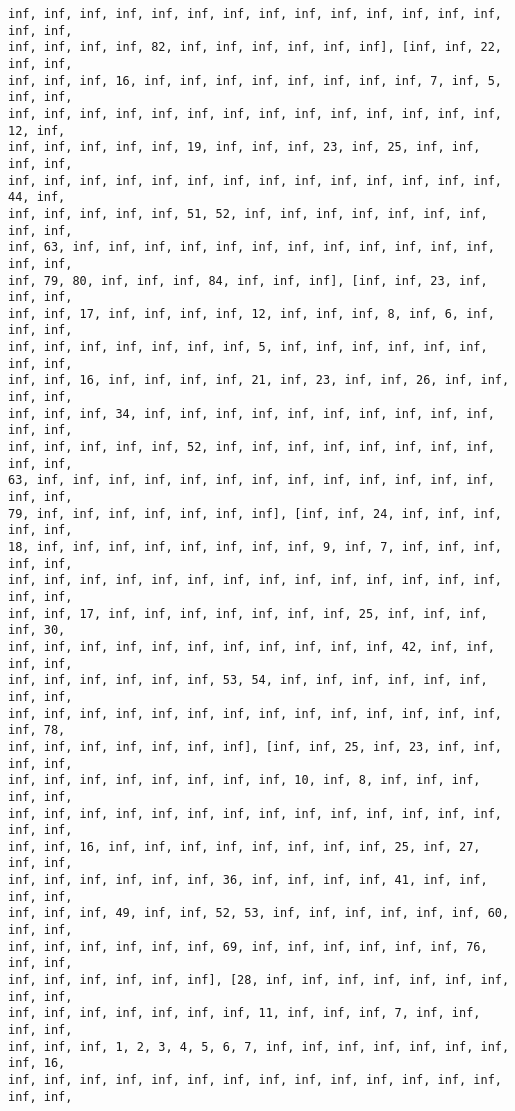 \documentclass[11pt]{article}
\begin{document}
\begin{Verbatim}[commandchars=\\\{\}]
inf, inf, inf, inf, inf, inf, inf, inf, inf, inf, inf, inf, inf, inf, inf, inf,
inf, inf, inf, inf, 82, inf, inf, inf, inf, inf, inf], [inf, inf, 22, inf, inf,
inf, inf, inf, 16, inf, inf, inf, inf, inf, inf, inf, inf, 7, inf, 5, inf, inf,
inf, inf, inf, inf, inf, inf, inf, inf, inf, inf, inf, inf, inf, inf, 12, inf,
inf, inf, inf, inf, inf, 19, inf, inf, inf, 23, inf, 25, inf, inf, inf, inf,
inf, inf, inf, inf, inf, inf, inf, inf, inf, inf, inf, inf, inf, inf, 44, inf,
inf, inf, inf, inf, inf, 51, 52, inf, inf, inf, inf, inf, inf, inf, inf, inf,
inf, 63, inf, inf, inf, inf, inf, inf, inf, inf, inf, inf, inf, inf, inf, inf,
inf, 79, 80, inf, inf, inf, 84, inf, inf, inf], [inf, inf, 23, inf, inf, inf,
inf, inf, 17, inf, inf, inf, inf, 12, inf, inf, inf, 8, inf, 6, inf, inf, inf,
inf, inf, inf, inf, inf, inf, inf, 5, inf, inf, inf, inf, inf, inf, inf, inf,
inf, inf, 16, inf, inf, inf, inf, 21, inf, 23, inf, inf, 26, inf, inf, inf, inf,
inf, inf, inf, 34, inf, inf, inf, inf, inf, inf, inf, inf, inf, inf, inf, inf,
inf, inf, inf, inf, inf, 52, inf, inf, inf, inf, inf, inf, inf, inf, inf, inf,
63, inf, inf, inf, inf, inf, inf, inf, inf, inf, inf, inf, inf, inf, inf, inf,
79, inf, inf, inf, inf, inf, inf, inf], [inf, inf, 24, inf, inf, inf, inf, inf,
18, inf, inf, inf, inf, inf, inf, inf, inf, 9, inf, 7, inf, inf, inf, inf, inf,
inf, inf, inf, inf, inf, inf, inf, inf, inf, inf, inf, inf, inf, inf, inf, inf,
inf, inf, 17, inf, inf, inf, inf, inf, inf, inf, 25, inf, inf, inf, inf, 30,
inf, inf, inf, inf, inf, inf, inf, inf, inf, inf, inf, 42, inf, inf, inf, inf,
inf, inf, inf, inf, inf, inf, 53, 54, inf, inf, inf, inf, inf, inf, inf, inf,
inf, inf, inf, inf, inf, inf, inf, inf, inf, inf, inf, inf, inf, inf, inf, 78,
inf, inf, inf, inf, inf, inf, inf], [inf, inf, 25, inf, 23, inf, inf, inf, inf,
inf, inf, inf, inf, inf, inf, inf, inf, 10, inf, 8, inf, inf, inf, inf, inf,
inf, inf, inf, inf, inf, inf, inf, inf, inf, inf, inf, inf, inf, inf, inf, inf,
inf, inf, 16, inf, inf, inf, inf, inf, inf, inf, inf, 25, inf, 27, inf, inf,
inf, inf, inf, inf, inf, inf, 36, inf, inf, inf, inf, 41, inf, inf, inf, inf,
inf, inf, inf, 49, inf, inf, 52, 53, inf, inf, inf, inf, inf, inf, 60, inf, inf,
inf, inf, inf, inf, inf, inf, 69, inf, inf, inf, inf, inf, inf, 76, inf, inf,
inf, inf, inf, inf, inf, inf], [28, inf, inf, inf, inf, inf, inf, inf, inf, inf,
inf, inf, inf, inf, inf, inf, inf, 11, inf, inf, inf, 7, inf, inf, inf, inf,
inf, inf, inf, 1, 2, 3, 4, 5, 6, 7, inf, inf, inf, inf, inf, inf, inf, inf, 16,
inf, inf, inf, inf, inf, inf, inf, inf, inf, inf, inf, inf, inf, inf, inf, inf,

\end{Verbatim}
\end{document}
